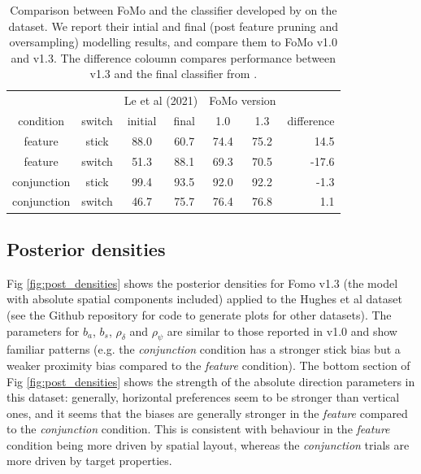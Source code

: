 \documentclass[man, floatsintext]{apa7}
\begin{document}
\begin{table}
    \centering
    \begin{tabular}{cc|cc|cc|r}
     & & \multicolumn{2}{c|}{Le et al (2021) \cite{le2021}}
      & \multicolumn{2}{c|}{FoMo version} & \\
        condition  & switch &initial & final & 1.0  & 1.3 & difference\\
        \hline
         feature      & stick     & 88.0&60.7  & 74.4& 75.2 & 14.5 \\
                                  feature      & switch    & 51.3&88.1  & 69.3& 70.5 & -17.6\\
                                  conjunction  & stick     & 99.4&93.5  & 92.0& 92.2 &-1.3\\
                                  conjunction  & switch    & 46.7& 75.7  & 76.4& 76.8 & 1.1\\     
    \end{tabular}
    \caption{Comparison between FoMo and the classifier developed by \cite{le2021} on the \cite{kristjansson2014} dataset. We report their intial and final (post feature pruning and oversampling) modelling results, and compare them to FoMo v1.0 and v1.3. The difference coloumn compares performance between v1.3 and the final classifier from \cite{le2021}.}
    \label{tab:acc_switch}
\end{table}

\subsection{Posterior densities}

Fig \ref{fig:post_densities} shows the posterior densities for Fomo v1.3 (the model with absolute spatial components included) applied to the Hughes et al \cite{hughes2024} dataset (see the Github repository for code to generate plots for other datasets). The parameters for $b_{a}$, $b_{s}$, $\rho_{\delta}$ and $\rho_{\psi}$ are similar to those reported in v1.0 and show familiar patterns (e.g. the \textit{conjunction} condition has a stronger stick bias but a weaker proximity bias compared to the \textit{feature} condition). The bottom section of Fig \ref{fig:post_densities} shows the strength of the absolute direction parameters in this dataset: generally, horizontal preferences seem to be stronger than vertical ones, and it seems that the biases are generally stronger in the \textit{feature} compared to the \textit{conjunction} condition. This is consistent with behaviour in the \textit{feature} condition being more driven by spatial layout, whereas the \textit{conjunction} trials are more driven by target properties.
\end{document}
